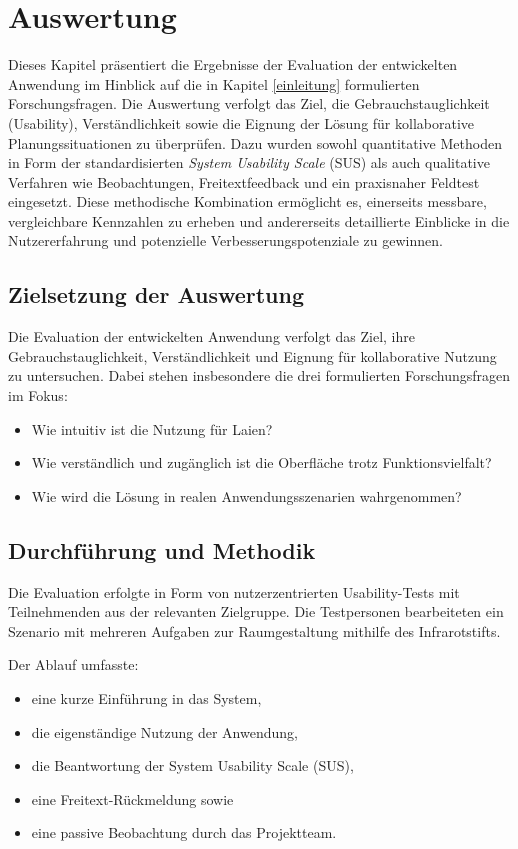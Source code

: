 \section{Auswertung}

Dieses Kapitel präsentiert die Ergebnisse der Evaluation der entwickelten Anwendung im Hinblick auf die in Kapitel \ref{einleitung} formulierten Forschungsfragen.  
Die Auswertung verfolgt das Ziel, die Gebrauchstauglichkeit (Usability), Verständlichkeit sowie die Eignung der Lösung für kollaborative Planungssituationen zu überprüfen.  
Dazu wurden sowohl quantitative Methoden in Form der standardisierten \textit{System Usability Scale} (SUS) als auch qualitative Verfahren wie Beobachtungen, Freitextfeedback und ein praxisnaher Feldtest eingesetzt.  
Diese methodische Kombination ermöglicht es, einerseits messbare, vergleichbare Kennzahlen zu erheben und andererseits detaillierte Einblicke in die Nutzererfahrung und potenzielle Verbesserungspotenziale zu gewinnen.



\subsection{Zielsetzung der Auswertung}

Die Evaluation der entwickelten Anwendung verfolgt das Ziel, ihre Gebrauchstauglichkeit, Verständlichkeit und Eignung für kollaborative Nutzung zu untersuchen. Dabei stehen insbesondere die drei formulierten Forschungsfragen im Fokus:
\begin{itemize}
    \item Wie intuitiv ist die Nutzung für Laien?
    \item Wie verständlich und zugänglich ist die Oberfläche trotz Funktionsvielfalt?
    \item Wie wird die Lösung in realen Anwendungsszenarien wahrgenommen?
\end{itemize}

\subsection{Durchführung und Methodik}

Die Evaluation erfolgte in Form von nutzerzentrierten Usability-Tests mit Teilnehmenden aus der relevanten Zielgruppe. Die Testpersonen bearbeiteten ein Szenario mit mehreren Aufgaben zur Raumgestaltung mithilfe des Infrarotstifts.


Der Ablauf umfasste:
\begin{itemize}
    \item eine kurze Einführung in das System,
    \item die eigenständige Nutzung der Anwendung,
    \item die Beantwortung der System Usability Scale (SUS),
    \item eine Freitext-Rückmeldung sowie
    \item eine passive Beobachtung durch das Projektteam.
\end{itemize}

